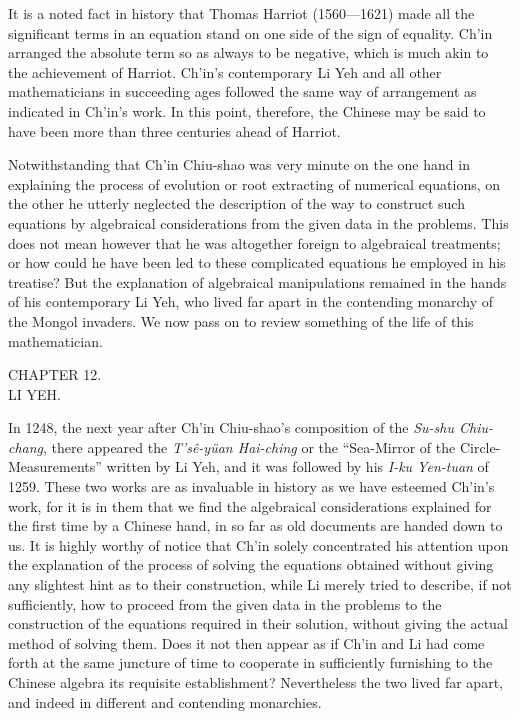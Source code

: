 \documentclass[11pt]{article}
\newcommand{\scanpage}[2]{\clearpage\setcounter{footnote}{0}\noindent{\footnotesize\color{gray}PDF page #1 · #2}\par\medskip}
\newcommand{\scanfooter}{}
\begin{document}
It is a noted fact in history that Thomas Harriot (1560---1621) made all the significant terms in an equation stand on one side of the sign of equality. Ch'in arranged the absolute term so as always to be negative, which is much akin to the achievement of Harriot. Ch'in's contemporary Li Yeh and all other mathematicians in succeeding ages followed the same way of arrangement as indicated in Ch'in's work. In this point, therefore, the Chinese may be said to have been more than three centuries ahead of Harriot.

Notwithstanding that Ch'in Chiu-shao was very minute on the one hand in explaining the process of evolution or root extracting of numerical equations, on the other he utterly neglected the description of the way to construct such equations by algebraical considerations from the given data in the problems. This does not mean however that he was altogether foreign to algebraical treatments; or how could he have been led to these complicated equations he employed in his treatise? But the explanation of algebraical manipulations remained in the hands of his contemporary Li Yeh, who lived far apart in the contending monarchy of the Mongol invaders. We now pass on to review something of the life of this mathematician.
\scanfooter


\scanpage{0093}{Chapter 12 opening, printed page 79}
\setcounter{footnote}{0}
\begin{center}
CHAPTER 12.\\
LI YEH.
\end{center}

In 1248, the next year after Ch'in Chiu-shao's composition of the \emph{Su-shu Chiu-chang}, there appeared the \emph{T'sê-yüan Hai-ching} or the ``Sea-Mirror of the Circle-Measurements'' written by Li Yeh, and it was followed by his \emph{I-ku Yen-tuan} of 1259. These two works are as invaluable in history as we have esteemed Ch'in's work, for it is in them that we find the algebraical considerations explained for the first time by a Chinese hand, in so far as old documents are handed down to us. It is highly worthy of notice that Ch'in solely concentrated his attention upon the explanation of the process of solving the equations obtained without giving any slightest hint as to their construction, while Li merely tried to describe, if not sufficiently, how to proceed from the given data in the problems to the construction of the equations required in their solution, without giving the actual method of solving them. Does it not then appear as if Ch'in and Li had come forth at the same juncture of time to cooperate in sufficiently furnishing to the Chinese algebra its requisite establishment? Nevertheless the two lived far apart, and indeed in different and contending monarchies.
\end{document}
